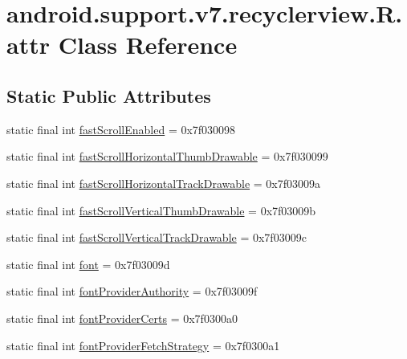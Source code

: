 \hypertarget{classandroid_1_1support_1_1v7_1_1recyclerview_1_1R_1_1attr}{}\section{android.\+support.\+v7.\+recyclerview.\+R.\+attr Class Reference}
\label{classandroid_1_1support_1_1v7_1_1recyclerview_1_1R_1_1attr}
\subsection*{Static Public Attributes}
\begin{DoxyCompactItemize}
\item 
static final int \mbox{\hyperlink{classandroid_1_1support_1_1v7_1_1recyclerview_1_1R_1_1attr_a5aa1b17458ce7df6b20a60420b248996}{fast\+Scroll\+Enabled}} = 0x7f030098
\item 
static final int \mbox{\hyperlink{classandroid_1_1support_1_1v7_1_1recyclerview_1_1R_1_1attr_ab5805abff2c39da693b8f51fe01a1c42}{fast\+Scroll\+Horizontal\+Thumb\+Drawable}} = 0x7f030099
\item 
static final int \mbox{\hyperlink{classandroid_1_1support_1_1v7_1_1recyclerview_1_1R_1_1attr_a0181829d24eed87b2e10e67e627df712}{fast\+Scroll\+Horizontal\+Track\+Drawable}} = 0x7f03009a
\item 
static final int \mbox{\hyperlink{classandroid_1_1support_1_1v7_1_1recyclerview_1_1R_1_1attr_ab4defa9597fea23f65beb632b6db4256}{fast\+Scroll\+Vertical\+Thumb\+Drawable}} = 0x7f03009b
\item 
static final int \mbox{\hyperlink{classandroid_1_1support_1_1v7_1_1recyclerview_1_1R_1_1attr_aafd1b486cccc20ce9c848296759844d1}{fast\+Scroll\+Vertical\+Track\+Drawable}} = 0x7f03009c
\item 
static final int \mbox{\hyperlink{classandroid_1_1support_1_1v7_1_1recyclerview_1_1R_1_1attr_a2a2dcc2e610d2eb4f755722569bd6d72}{font}} = 0x7f03009d
\item 
static final int \mbox{\hyperlink{classandroid_1_1support_1_1v7_1_1recyclerview_1_1R_1_1attr_ad1ecdf7f8385b4cc50743811e55e5645}{font\+Provider\+Authority}} = 0x7f03009f
\item 
static final int \mbox{\hyperlink{classandroid_1_1support_1_1v7_1_1recyclerview_1_1R_1_1attr_a2b16bc45eb8d6fc743a3cf5d44946c91}{font\+Provider\+Certs}} = 0x7f0300a0
\item 
static final int \mbox{\hyperlink{classandroid_1_1support_1_1v7_1_1recyclerview_1_1R_1_1attr_a3defd1f1698fe4775a575c28641cb2a7}{font\+Provider\+Fetch\+Strategy}} = 0x7f0300a1

\end{DoxyCompactItemize}
